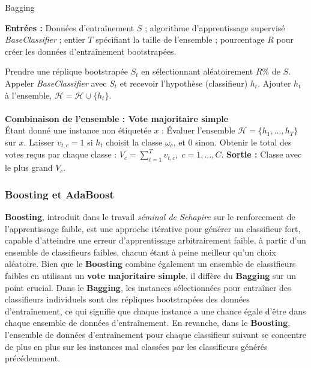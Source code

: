 \begin{algorithm}
	\caption{Bagging~\cite{polikar2012ensemble}}
	\textbf{Entrées :} Données d'entraînement $S$ ; algorithme d'apprentissage supervisé \textit{BaseClassifier} ; entier $T$ spécifiant la taille de l'ensemble ; pourcentage $R$ pour créer les données d'entraînement bootstrapées.
	\begin{algorithmic}
		\State Prendre une réplique bootstrapée $S_t$ en sélectionnant aléatoirement $R\%$ de $S$.
		\State Appeler \textit{BaseClassifier} avec $S_t$ et recevoir l'hypothèse (classifieur) $h_t$.
		\State Ajouter $h_t$ à l'ensemble, $\mathcal{H} = \mathcal{H} \cup \{h_t\}$.
		\EndFor\\\\
		\textbf{Combinaison de l'ensemble : Vote majoritaire simple}\\
		\State Étant donné une instance non étiquetée $x$ :
		\State Évaluer l'ensemble $\mathcal{H} = \{h_1, \dots, h_T\}$ sur $x$.
		\State Laisser $v_{t,c} = 1$ si $h_t$ choisit la classe $\omega_c$, et 0 sinon.
		\EndFor
		\State Obtenir le total des votes reçus par chaque classe : $V_c = \sum_{t=1}^{T} v_{t,c}, \; c = 1, \dots, C$.
		\State \textbf{Sortie :} Classe avec le plus grand $V_c$.
	\end{algorithmic}
\end{algorithm}


\subsubsection{Boosting et AdaBoost}
\textbf{Boosting}, introduit dans le travail \textit{séminal de Schapire} sur le renforcement de l'apprentissage faible, est une approche itérative pour générer un classifieur fort, capable d'atteindre une erreur d'apprentissage arbitrairement faible, à partir d'un ensemble de classifieurs faibles, chacun étant à peine meilleur qu'un choix aléatoire. Bien que le \textbf{Boosting} combine également un ensemble de classifieurs faibles en utilisant un \textbf{vote majoritaire simple}, il diffère du \textbf{Bagging} sur un point crucial. Dans le \textbf{Bagging}, les instances sélectionnées pour entraîner des classifieurs individuels sont des répliques bootstrapées des données d'entraînement, ce qui signifie que chaque instance a une chance égale d'être dans chaque ensemble de données d'entraînement. En revanche, dans le \textbf{Boosting}, l'ensemble de données d'entraînement pour chaque classifieur suivant se concentre de plus en plus sur les instances mal classées par les classifieurs générés précédemment.

